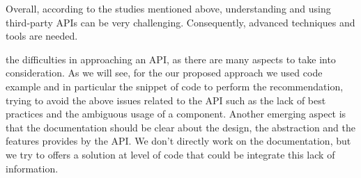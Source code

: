 Overall, according to the studies mentioned above, understanding and using 
third-party APIs can be very challenging. Consequently, advanced techniques and 
tools are needed.

the difficulties in approaching an API, as there are many aspects to take into 
consideration. As we will see, for the our proposed approach we used code 
example and in particular the snippet of code to perform the recommendation, 
trying to avoid the above issues related to the API such as the lack of best 
practices and the ambiguous usage of a component. Another emerging aspect is 
that the documentation should be clear about the design, the abstraction and 
the features provides by the API. We don't directly work on the documentation, 
but we try to offers a solution at level of code that could be integrate this 
lack of information.



